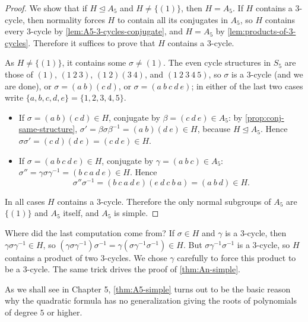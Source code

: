 \begin{proof}
	We show that if \(H \trianglelefteq A_5\) and \(H \neq \{(1)\}\), then \(H = A_5\). If
	\(H\) contains a \(3\)-cycle, then normality forces \(H\) to contain all its conjugates
	in \(A_5\), so \(H\) contains every \(3\)-cycle by
	\autoref{lem:A5-3-cycles-conjugate}, and \(H = A_5\) by
	\autoref{lem:products-of-3-cycles}. Therefore it suffices to prove that \(H\) contains
	a \(3\)-cycle.

	As \(H \neq \{(1)\}\), it contains some \(\sigma \neq (1)\). The even cycle structures
	in \(S_5\) are those of \((1)\), \((1\ 2\ 3)\), \((1\ 2)(3\ 4)\), and
	\((1\ 2\ 3\ 4\ 5)\), so \(\sigma\) is a \(3\)-cycle (and we are done), or
	\(\sigma = (a\ b)(c\ d)\), or \(\sigma = (a\ b\ c\ d\ e)\); in either of the last two
	cases write \(\{a, b, c, d, e\} = \{1, 2, 3, 4, 5\}\).
	\begin{itemize}
		\item If \(\sigma = (a\ b)(c\ d) \in H\), conjugate by \(\beta = (c\ d\ e) \in A_5\):
		      by \autoref{prop:conj-same-structure},
		      \(\sigma' = \beta\sigma\beta^{-1} = (a\ b)(d\ e) \in H\), because
		      \(H \trianglelefteq A_5\). Hence
		      \(\sigma\sigma' = (c\ d)(d\ e) = (c\ d\ e) \in H\).
		\item If \(\sigma = (a\ b\ c\ d\ e) \in H\), conjugate by
		      \(\gamma = (a\ b\ c) \in A_5\):
		      \(\sigma'' = \gamma\sigma\gamma^{-1} = (b\ c\ a\ d\ e) \in H\). Hence
		      \[
			      \sigma''\sigma^{-1} = (b\ c\ a\ d\ e)(e\ d\ c\ b\ a) = (a\ b\ d) \in H.
		      \]
	\end{itemize}
	In all cases \(H\) contains a \(3\)-cycle. Therefore the only normal subgroups of \(A_5\)
	are \(\{(1)\}\) and \(A_5\) itself, and \(A_5\) is simple.
\end{proof}

\begin{remark}
	Where did the last computation come from? If \(\sigma \in H\) and \(\gamma\) is a
	\(3\)-cycle, then \(\gamma\sigma\gamma^{-1} \in H\), so
	\((\gamma\sigma\gamma^{-1})\sigma^{-1} = \gamma(\sigma\gamma^{-1}\sigma^{-1}) \in H\).
	But \(\sigma\gamma^{-1}\sigma^{-1}\) is a \(3\)-cycle, so \(H\) contains a product of
	two \(3\)-cycles. We chose \(\gamma\) carefully to force this product to be a
	\(3\)-cycle. The same trick drives the proof of \autoref{thm:An-simple}.
\end{remark}

\begin{remark}
	As we shall see in Chapter 5, \autoref{thm:A5-simple} turns out to be the basic reason
	why the quadratic formula has no generalization giving the roots of polynomials of
	degree \(5\) or higher.
\end{remark}

